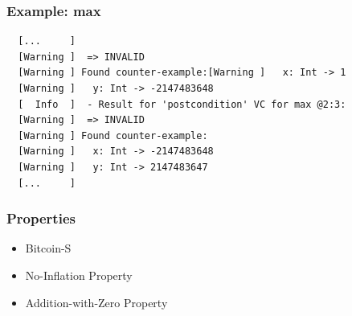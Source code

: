 \documentclass{beamer}
\begin{document}
\begin{frame}[fragile]
\frametitle{Example: max}
{\small\begin{verbatim}
  [...     ]
  [Warning ]  => INVALID
  [Warning ] Found counter-example:[Warning ]   x: Int -> 1
  [Warning ]   y: Int -> -2147483648
  [  Info  ]  - Result for 'postcondition' VC for max @2:3:
  [Warning ]  => INVALID
  [Warning ] Found counter-example:
  [Warning ]   x: Int -> -2147483648
  [Warning ]   y: Int -> 2147483647
  [...     ]
\end{verbatim}}

\end{frame}


\begin{frame}
\frametitle{Properties}
\begin{itemize}
  \item Bitcoin-S
  \item No-Inflation Property
  \item Addition-with-Zero Property
\end{itemize}
\end{frame}
\end{document}
